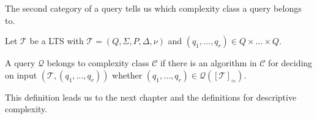 The second category of a query tells us which complexity class a query belongs to.

\begin{definition}
    \label{definition:queryBelongsToComplexityClass}
    Let $\mathcal{T}$ be a LTS with $\mathcal{T} = (Q, \Sigma, P, \Delta, \nu)$ and $(q_1, \dots, q_{r}) \in Q \times
    \dots \times Q$.

    A query $\mathcal{Q}$ belongs to complexity class $\mathcal{C}$ if there is an algorithm in $\mathcal{C}$ for
    deciding on input $(\mathcal{T}, (q_1, \dots, q_{r}))$ whether $(q_1, \dots, q_{r}) \in \mathcal{Q}
    ([\mathcal{T}]_\simeq)$.
\end{definition}

This definition leads us to the next chapter and the definitions for descriptive complexity.